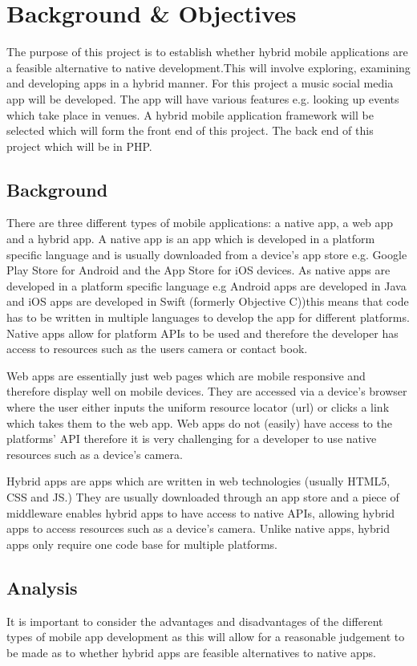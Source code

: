\chapter{Background \& Objectives}

The purpose of this project is to establish whether hybrid mobile applications are a feasible alternative to native development.This will involve exploring, examining and developing apps in a hybrid manner. For this project a music social media app will be developed. The app will have various features e.g. looking up events which take place in  venues. A hybrid mobile application framework will be selected which will form the front end of this project. The back end of this project which will be in PHP.

\section{Background}
There are three different types of mobile applications: a native app, a web app and a hybrid app. A native app is an app which is developed in a platform specific language and is usually downloaded from a device's app store e.g. Google Play Store for Android and the App Store for iOS devices. As  native apps are developed in a platform specific language e.g Android apps are developed in Java and iOS apps are developed in Swift (formerly Objective C))this means that  code has to be written in multiple languages to develop the app for different platforms. Native apps allow for platform APIs to be used and therefore the developer has access to resources such as the users camera or contact book. 

Web apps are essentially just web pages which are mobile responsive and therefore display well on mobile devices. They are accessed via a device's browser where the user either inputs the uniform resource locator (url) or clicks a link which takes them to the web app. Web apps do not (easily) have access to the platforms' API therefore it is very challenging for a developer to use native resources such as a device's camera. 

Hybrid apps are apps which are written in web technologies (usually HTML5, CSS and JS.) They are usually downloaded through an app store and a piece of middleware enables hybrid apps to have access to native APIs, allowing hybrid apps to access resources such as a device's camera. Unlike native apps, hybrid apps only require one code base for multiple platforms.

\section{Analysis}
It is important to consider the advantages and disadvantages of the different types of mobile app development as this will allow for a reasonable judgement to be made as to whether hybrid apps are feasible alternatives to native apps.

